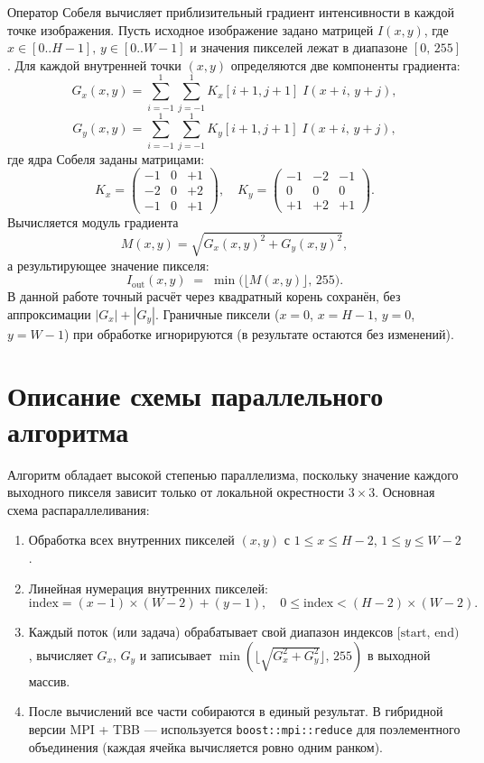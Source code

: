 \documentclass[12pt]{article}
\begin{document}
Оператор Собеля вычисляет приблизительный градиент интенсивности в каждой точке изображения. Пусть исходное изображение задано матрицей $I(x,y)$, где $x\in[0..H-1],\,y\in[0..W-1]$ и значения пикселей лежат в диапазоне $[0,\,255]$. Для каждой внутренней точки $(x,y)$ определяются две компоненты градиента:
\[
G_x(x,y) = \sum_{i=-1}^{1} \sum_{j=-1}^{1} K_x[i+1,j+1]\;I(x+i,\,y+j),
\]
\[
G_y(x,y) = \sum_{i=-1}^{1} \sum_{j=-1}^{1} K_y[i+1,j+1]\;I(x+i,\,y+j),
\]
где ядра Собеля заданы матрицами:
\[
K_x = 
\begin{pmatrix}
-1 & 0 & +1 \\
-2 & 0 & +2 \\
-1 & 0 & +1
\end{pmatrix},\quad
K_y = 
\begin{pmatrix}
-1 & -2 & -1 \\
 0 &  0 &  0 \\
+1 & +2 & +1
\end{pmatrix}.
\]
Вычисляется модуль градиента
\[
M(x,y) = \sqrt{G_x(x,y)^2 + G_y(x,y)^2},
\]
а результирующее значение пикселя:
\[
I_{\text{out}}(x,y) \;=\; \min\bigl(\lfloor M(x,y)\rfloor,\,255\bigr).
\]
В данной работе точный расчёт через квадратный корень сохранён, без аппроксимации $|G_x| + |G_y|$. Граничные пиксели ($x=0$, $x=H-1$, $y=0$, $y=W-1$) при обработке игнорируются (в результате остаются без изменений).

\section{Описание схемы параллельного алгоритма}

Алгоритм обладает высокой степенью параллелизма, поскольку значение каждого выходного пикселя зависит только от локальной окрестности $3\times 3$. Основная схема распараллеливания:
\begin{enumerate}
    \item Обработка всех внутренних пикселей $(x,y)$ с $1 \le x \le H-2$, $1 \le y \le W-2$.
    \item Линейная нумерация внутренних пикселей: 
    \[
    \text{index} = (x - 1)\times (W - 2) + (y - 1),\quad 
    0 \le \text{index} < (H - 2)\times (W - 2).
    \]
    \item Каждый поток (или задача) обрабатывает свой диапазон индексов $\bigl[\text{start},\,\text{end}\bigr)$, вычисляет $G_x,\,G_y$ и записывает $\min(\lfloor\sqrt{G_x^2+G_y^2}\rfloor,\,255)$ в выходной массив.
    \item После вычислений все части собираются в единый результат. В гибридной версии MPI + TBB — используется \lstinline[breaklines]{boost::mpi::reduce} для поэлементного объединения (каждая ячейка вычисляется ровно одним ранком).
\end{enumerate}
\end{document}
